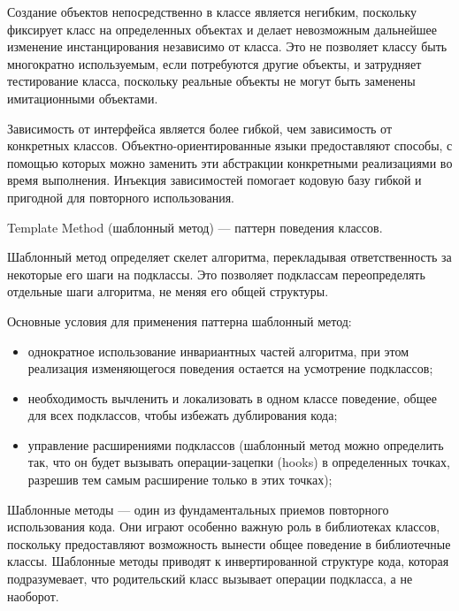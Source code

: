 Создание объектов непосредственно в классе является негибким, поскольку фиксирует класс на определенных объектах и делает невозможным дальнейшее изменение инстанцирования независимо от класса. Это не позволяет классу быть многократно используемым, если потребуются другие объекты, и затрудняет тестирование класса, поскольку реальные объекты не могут быть заменены имитационными объектами.

Зависимость от интерфейса является более гибкой, чем зависимость от конкретных классов. Объектно-ориентированные языки предоставляют способы, с помощью которых можно заменить эти абстракции конкретными реализациями во время выполнения. Инъекция зависимостей помогает кодовую базу гибкой и пригодной для повторного использования.




Template Method (шаблонный метод) \cite{patterns} --- паттерн поведения классов.

Шаблонный метод определяет скелет алгоритма, перекладывая ответственность за некоторые его шаги на подклассы. Это позволяет подклассам переопределять отдельные шаги алгоритма, не меняя его общей структуры.

Основные условия для применения паттерна шаблонный метод:

\begin{itemize}[label*=---]
	\item однократное использование инвариантных частей алгоритма, при этом реализация изменяющегося поведения остается на усмотрение подклассов;
	\item необходимость вычленить и локализовать в одном классе поведение, общее для всех подклассов, чтобы избежать дублирования кода;
	\item управление расширениями подклассов (шаблонный метод можно определить так, что он будет вызывать операции-зацепки (hooks) в определенных точках, разрешив тем самым расширение только в этих точках);
\end{itemize}

Шаблонные методы --- один из фундаментальных приемов повторного использования кода. Они играют особенно важную роль в библиотеках классов, поскольку предоставляют возможность вынести общее поведение в библиотечные классы. Шаблонные методы приводят к инвертированной структуре кода, которая подразумевает, что родительский класс вызывает операции подкласса, а не наоборот.

\pagebreak